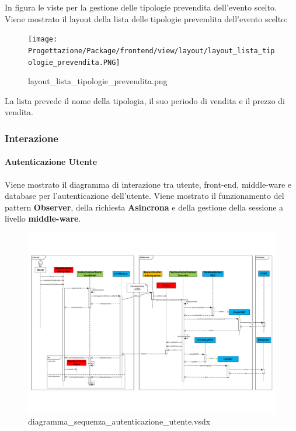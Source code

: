 \documentclass[a4paper]{article}
\begin{document}
In figura le viste per la gestione delle tipologie prevendita dell'evento scelto. Viene mostrato il layout della lista delle tipologie prevendita dell'evento scelto:

\begin{figure}[H]
    \texttt{[image: Progettazione/Package/frontend/view/layout/layout\_lista\_tipologie\_prevendita.PNG]}
    \centering
    \caption{layout\_lista\_tipologie\_prevendita.png}
\end{figure}

La lista prevede il nome della tipologia, il suo periodo di vendita e il prezzo di vendita.

\newpage

\subsubsection{Interazione}

\paragraph{Autenticazione Utente} Viene mostrato il diagramma di interazione tra utente, front-end, middle-ware e database per l'autenticazione dell'utente. Viene mostrato il funzionamento del pattern \textbf{Observer}, della richiesta \textbf{Asincrona} e della gestione della sessione a livello \textbf{middle-ware}.


\begin{figure}[H]
    \includegraphics[angle=90,scale=0.55]{Progettazione/Interazione/diagramma_sequenza_autenticazione_utente.pdf}
    \centering
    \caption{diagramma\_sequenza\_autenticazione\_utente.vsdx}
\end{figure}
\end{document}
